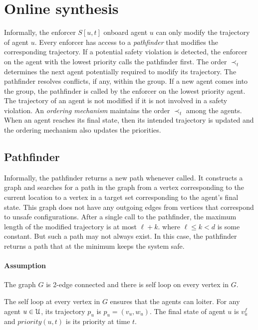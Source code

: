\section{Online synthesis}
Informally, the enforcer $S[u,t]$ onboard agent $u$ can only modify the trajectory of agent $u$. 
Every enforcer has access to a \emph{pathfinder} that modifies the corresponding trajectory. If a potential safety violation is detected, the enforcer on the agent with the lowest priority calls the pathfinder first. The order $\prec_t$ determines the next agent potentially required to modify its trajectory.
The pathfinder resolves conflicts, if any, within the group. If a new agent comes into the group, the pathfinder is called by the enforcer on the lowest priority agent. The trajectory of an agent is not modified if it is not involved in a safety violation. 
An \emph{ordering mechanism} maintains the order $\prec_t$ among the agents. When an agent reaches its final state, then its intended trajectory is updated and the ordering mechanism also updates the priorities.

\subsection{Pathfinder}

Informally, the pathfinder returns a new path whenever called. It constructs a graph and searches for a path in the graph from a vertex corresponding to the current location to a vertex in a target set corresponding to the agent's final state. This graph does not have any outgoing edges from vertices that correspond to unsafe configurations. After a single call to the pathfinder, the maximum length of the modified trajectory is at most $\ell + k$. where $\ell \leq k < d$ is some constant. But such a path may not always exist. In this case, the pathfinder returns a path that at the minimum keeps the system safe.

\paragraph*{Assumption}
The graph $G$ is 2-edge connected  and there is self loop on every vertex in $G$.

The self loop at every vertex in $G$ ensures that the agents can loiter.
For any agent $u \in \mathcal{U}$, its trajectory $p_u$ is $p_u=(v_u,w_u)$.
The final state of agent $u$ is $v_u^f$ and $priority(u,t)$ is its priority at time $t$. 

